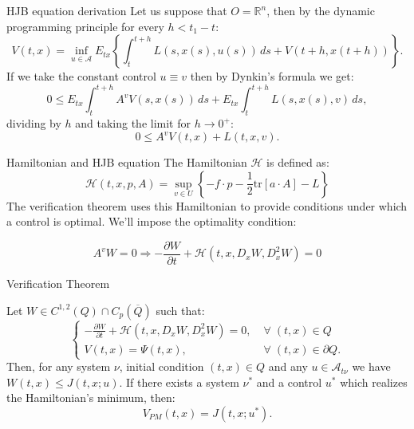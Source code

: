 \documentclass[10pt, compress]{beamer}
\newcommand{\R}{\mathbb{R}}
\let\oldforall\forall
\renewcommand{\forall}{\; \oldforall \;}
\begin{document}
\begin{frame}{HJB equation derivation}
    Let us suppose that $O=\R^n$, then by the dynamic programming principle for every $h<t_1-t$:
    \[V(t,x) = \inf_{u\in\mathcal{A}}E_{tx}\left\{\int_t^{t+h} L(s,x(s),u(s))\,ds + V(t+h,x(t+h))\right\}.\]
    If we take the constant control $u\equiv v$ then by Dynkin's formula we get:
    \[
        0 \leq E_{tx}\int_t^{t+h} A^vV(s,x(s))\,ds + E_{tx}\int_t^{t+h} L(s,x(s),v)\,ds,
    \]
    dividing by $h$ and taking the limit for $h\to0^+$:
    \[0 \leq A^vV(t,x) + L(t,x,v).\]
\end{frame}

\begin{frame}{Hamiltonian and HJB equation}
    The Hamiltonian $\mathcal{H}$ is defined as:
    \begin{equation}\label{Def: Hamiltonian Stochastic  }
        \mathcal{H}(t,x,p,A) = \sup_{v\in U}\left\{-f\cdot p - \frac{1}{2}\text{tr}\left[a\cdot A\right] - L\right\}
    \end{equation}
    The verification theorem uses this Hamiltonian to provide conditions under which a control is optimal. We'll impose the optimality condition:

    \[A^vW = 0 \Rightarrow -\frac{\partial W}{\partial t} + \mathcal{H}(t,x,D_xW,D_x^2W) = 0\]
\end{frame}

\begin{frame}{Verification Theorem}
    \begin{theorem}
    Let $W\in C^{1,2}(Q)\cap C_p(\overline{Q})$ such that:
    \begin{equation}\label{systverstoch}\begin{cases}
        -\frac{\partial W}{\partial t} + \mathcal{H}(t,x,D_xW,D_x^2W) = 0, & \forall(t,x)\in Q \\
        V(t,x) = \Psi(t,x), & \forall(t,x)\in\partial Q.
    \end{cases}\end{equation}
    Then, for any system $\nu$, initial condition $(t,x)\in Q$ and any $u\in \mathcal{A}_{t\nu}$ we have $W(t,x)\leq J(t,x;u)$. If there exists a system $\nu^{\ast}$ and a control $u^{\ast}$ which realizes the Hamiltonian's minimum, then:
        \begin{equation}
            V_{PM}(t,x) = J(t,x;u^{\ast}).
        \end{equation}
    \end{theorem}
\end{frame}
\end{document}
